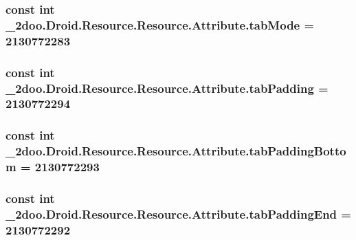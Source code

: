 \hypertarget{class__2doo_1_1_droid_1_1_resource_1_1_attribute_55bddbc78269379a20da4e36efe21bde}{
\subsubsection[{tabMode}]{\setlength{\rightskip}{0pt plus 5cm}const int \_\-2doo.Droid.Resource.Resource.Attribute.tabMode = 2130772283}}
\label{class__2doo_1_1_droid_1_1_resource_1_1_attribute_55bddbc78269379a20da4e36efe21bde}


\hypertarget{class__2doo_1_1_droid_1_1_resource_1_1_attribute_4cbb31114f1892d3e12ade6884459142}{
\subsubsection[{tabPadding}]{\setlength{\rightskip}{0pt plus 5cm}const int \_\-2doo.Droid.Resource.Resource.Attribute.tabPadding = 2130772294}}
\label{class__2doo_1_1_droid_1_1_resource_1_1_attribute_4cbb31114f1892d3e12ade6884459142}


\hypertarget{class__2doo_1_1_droid_1_1_resource_1_1_attribute_470d4d9a02c8c8a61746f80978e9c57a}{
\subsubsection[{tabPaddingBottom}]{\setlength{\rightskip}{0pt plus 5cm}const int \_\-2doo.Droid.Resource.Resource.Attribute.tabPaddingBottom = 2130772293}}
\label{class__2doo_1_1_droid_1_1_resource_1_1_attribute_470d4d9a02c8c8a61746f80978e9c57a}


\hypertarget{class__2doo_1_1_droid_1_1_resource_1_1_attribute_5043d56e3c88d7d26b2e920bbbbe2e2d}{
\subsubsection[{tabPaddingEnd}]{\setlength{\rightskip}{0pt plus 5cm}const int \_\-2doo.Droid.Resource.Resource.Attribute.tabPaddingEnd = 2130772292}}
\label{class__2doo_1_1_droid_1_1_resource_1_1_attribute_5043d56e3c88d7d26b2e920bbbbe2e2d}


